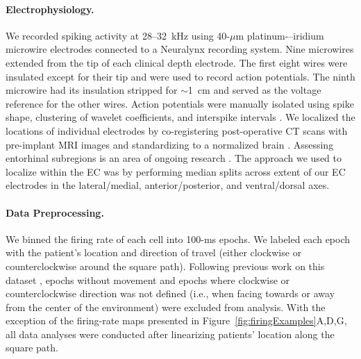 \paragraph{Electrophysiology.}  We recorded spiking activity at 28--32~kHz using 40-$\mu$m platinum-–iridium microwire electrodes \citep{FrieEtal99} connected to a Neuralynx recording system. Nine microwires extended from the tip of each clinical depth electrode. The first eight wires were insulated except for their tip and were used to record action potentials. The ninth microwire had its insulation stripped for $\sim$1~cm and served as the voltage reference for the other  wires. Action potentials were manually isolated using spike shape, clustering of wavelet coefficients, and interspike intervals \citep{QuirEtal04}.  We localized the locations of individual electrodes by co-registering post-operative CT scans with pre-implant MRI images and standardizing to a normalized brain \cite{TalaTour88}.  Assessing  entorhinal subregions is an  area of ongoing research \cite{KhanEtal14}. The approach we used to localize within the EC was by performing median splits across extent of our EC electrodes in the lateral/medial, anterior/posterior, and ventral/dorsal axes. %


\paragraph{Data Preprocessing.} We binned the firing rate of each cell into 100-ms epochs. We labeled each epoch with the patient's location and direction of travel (either clockwise or counterclockwise around the square path). Following previous work on this dataset \cite{JacoEtal07,JacoEtal10}, epochs without movement and epochs where clockwise or counterclockwise direction was not defined (i.e., when facing towards or away from the center of the environment) were excluded from analysis. With the exception of the firing-rate maps presented in Figure~\ref{fig:firingExamples}A,D,G, all data analyses were conducted after linearizing patients' location along the square path.   


